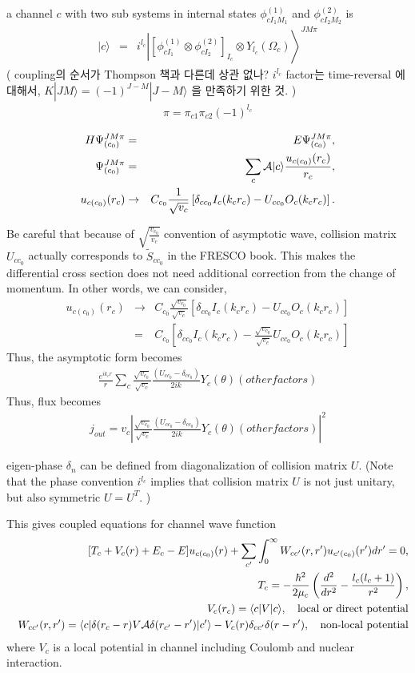 \documentclass[11pt]{book}
\def\la{\langle}
\def\ra{\rangle}
\newcommand{\bea}{\begin{eqnarray}}
\newcommand{\eea}{\end{eqnarray}}
\newcommand{\no}{\nonumber \\}
\begin{document}
a channel $c$ with two sub systems in internal states
$\phi^{(1)}_{cI_1 M_1}$ and $\phi^{(2)}_{cI_2 M_2}$ is 
\bea
|c\ra &=& i^{l_c}\left| [\phi^{(1)}_{cI_1}\otimes \phi^{(2)}_{cI_2}]_{I_c}\otimes Y_{l_c}(\Omega_c)\right\ra^{J M \pi}     
\eea 
( coupling의 순서가 Thompson 책과 다른데 상관 없나? 
 $i^{l_c}$ factor는 time-reversal 에 대해서,
 $K|JM\ra=(-1)^{J-M}|J-M\ra$ 을 만족하기 위한 것. )
\bea 
\pi=\pi_{c1}\pi_{c2}(-1)^{l_c}
\eea 

\bea 
H\Psi_{(c_0)}^{JM\pi}&=& E\Psi_{(c_0)}^{JM\pi},\no 
\Psi_{(c_0)}^{JM\pi}&=&\sum_{c}{\cal A}|c\ra \frac{ u_{c (c_0)}(r_c)}{r_c}, \no 
u_{c (c_0)}(r_c)&\to& C_{c_0} \frac{1}{\sqrt{v_c}}
   \left[ \delta_{cc_0} I_c(k_c r_c)-U_{cc_0} O_c(k_c r_c)\right].
\eea 

Be careful that because of $\sqrt{\frac{v_{c_0}}{v_c}} $ convention of asymptotic wave,
collision matrix $U_{cc_0}$ actually corresponds to $\tilde{S}_{cc_0}$ in the FRESCO book. 
This makes the differential cross section does not need additional correction
from the change of momentum. In other words, we can consider,
\bea 
u_{c (c_0)}(r_c)&\to& C_{c_0} \frac{\sqrt{v_{c_0}}}{\sqrt{v_c}}
\left[ \delta_{cc_0} I_c(k_c r_c)-U_{cc_0} O_c(k_c r_c)\right] \no 
  &=& C_{c_0}\left[ \delta_{cc_0} I_c(k_c r_c)-\frac{\sqrt{v_{c_0}}}{\sqrt{v_c}} U_{cc_0} O_c(k_c r_c)\right]
\eea 
Thus, the asymptotic form becomes
\bea 
\frac{e^{ik_c r}}{r} \sum_{c} \frac{\sqrt{v_{c_0}}}{\sqrt{v_c}} 
                     \frac{(U_{cc_0}-\delta_{cc_0})}{2ik} Y_{c}(\theta)(other factors)
\eea 
Thus, flux becomes 
\bea 
j_{out}= v_c | \frac{\sqrt{v_{c_0}}}{\sqrt{v_c}} 
\frac{(U_{cc_0}-\delta_{cc_0})}{2ik} Y_{c}(\theta)(other factors)|^2 
\eea 

eigen-phase $\delta_n$ can be defined from diagonalization of  
collision matrix $U$. 
(Note that the phase convention $i^{l_c}$ implies that 
collision matrix $U$ is not just unitary, but also symmetric 
$U=U^{T}$. )

This gives coupled equations for channel wave function
\bea 
& &[T_c+V_c(r)+E_c-E] u_{c(c_0)}(r)
+\sum_{c'}\int_0^\infty W_{cc'}(r,r') u_{c'(c_0)}(r') dr' =0,\no 
& & T_c=-\frac{\hbar^2}{2\mu_c}\left( \frac{d^2}{dr^2}-\frac{l_c(l_c+1)}{r^2}\right),\no 
& & V_c(r_c)=\la c|V|c\ra, \quad \mbox{local or direct potential}\no  
& & W_{cc'}(r,r')=\la c|\delta(r_c-r)V{\cal A}\delta(r_{c'}-r')|c'\ra 
                 -V_c(r)\delta_{cc'}\delta(r-r') 
                , \quad \mbox{non-local potential} 
\eea 
where $V_c$ is a local potential in channel including Coulomb and nuclear interaction. 
\end{document}
